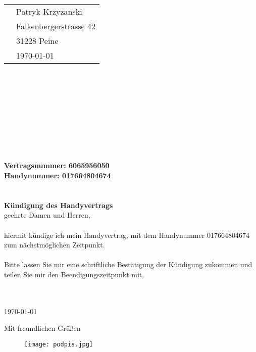 \documentclass{letter}
\begin{document}
\begin{letter}{}
\begin{tabular}{@{}p{3.0in}l}
& Patryk Krzyzanski\\
& Falkenbergerstrasse 42\\
& 31228 Peine\\
& \today
\end{tabular}\\ \\ \\ \\
\bigskip
\\
\\
\\
\\
\\
\textbf{Vertragsnummer: 6065956050}\\
\textbf{Handynummer: 017664804674}\\
\\
\\
\Large\textbf{K\"undigung des Handyvertrags}\\
\bigskip
\normalsize
\Sehr geehrte Damen und Herren, \\\\
hiermit kündige ich mein Handyvertrag, mit dem Handynummer 017664804674\\ zum nächstmöglichen Zeitpunkt.\\\\
Bitte lassen Sie mir eine schriftliche Bestätigung der Kündigung zukommen und teilen Sie mir den Beendigungszeitpunkt mit.\\ \\
\\
\bigskip

\today
 
\closing{Mit freundlichen Grüßen}
\begin{figure}
  \texttt{[image: podpis.jpg]}
\end{figure}



\end{letter}
\end{document}

